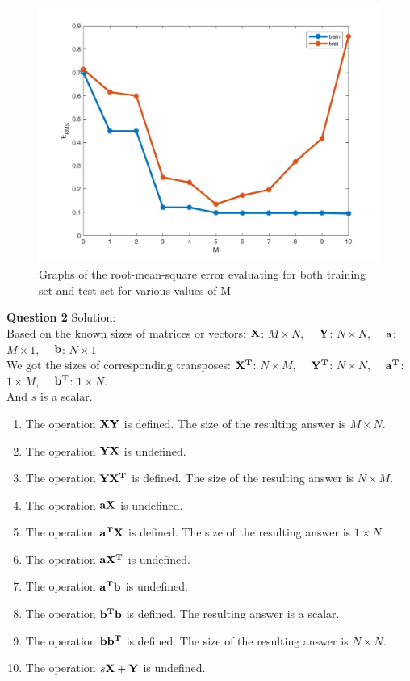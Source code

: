 \documentclass[a4paper]{article}
\begin{document}
\begin{spacing}{2.0}
	\begin{figure}[H]
	    \centering
	    \includegraphics[width=6in]{ERMS.jpeg}
	    \caption{Graphs of the root-mean-square error evaluating for both training set and test set for various values of M}
	\end{figure}

	
\huge{\textbf{ Question 2}}      \Large{Solution:} \\
	\normalsize 
	Based on the known sizes of matrices or vectors: $\bf{X}$: $M \times N$, \ \  $\bf{Y}$: $N \times N$, \ \  $\bf{a}$: $M
	\times 1$, \ \  $\bf{b}$: $N \times 1$\\
	We got the sizes of corresponding transposes: $\bf{X^T}$: $N \times M$, \ \  $\bf{Y^T}$: $N \times N$, \ \  $\bf{a^T}
	$: $1
	\times M$, \ \  $\bf{b^T}$: $1 \times N$.\\
	And $s$ is a scalar.
	\begin{enumerate}
		\item The operation $\bf{XY}$ is defined. The size of the resulting answer is $M \times N$.
		\item The operation $\bf{YX}$ is undefined.
		\item The operation $\bf{YX^T}$ is defined. The size of the resulting answer is $N \times M$.
		\item The operation $\bf{aX}$ is undefined.
		\item The operation $\bf{a^TX}$ is defined. The size of the resulting answer is $1 \times N$.
		\item The operation $\bf{aX^T}$ is undefined.
		\item The operation $\bf{a^Tb}$ is undefined.
		\item The operation $\bf{b^Tb}$ is defined. The resulting answer is a scalar.
		\item The operation $\bf{bb^T}$ is defined. The size of the resulting answer is $N \times N$.
		\item The operation $s\bf{X+Y}$ is undefined.\\
	\end{enumerate}


\end{spacing}
\end{document}
